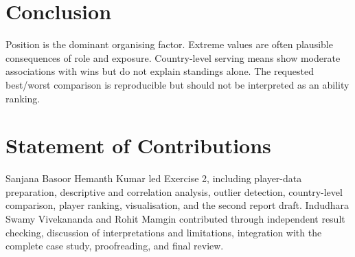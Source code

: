 \documentclass{MALEO_report}
\begin{document}
\section{Conclusion}
Position is the dominant organising factor. Extreme values are often plausible consequences of role and exposure. Country-level serving means show moderate associations with wins but do not explain standings alone. The requested best/worst comparison is reproducible but should not be interpreted as an ability ranking.
\section*{Statement of Contributions}
Sanjana Basoor Hemanth Kumar led Exercise 2, including player-data preparation, descriptive and correlation analysis, outlier detection, country-level comparison, player ranking, visualisation, and the second report draft. Indudhara Swamy Vivekananda and Rohit Mamgin contributed through independent result checking, discussion of interpretations and limitations, integration with the complete case study, proofreading, and final review.
\end{document}
